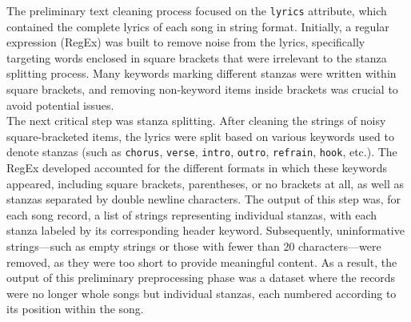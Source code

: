 The preliminary text cleaning process focused on the \texttt{lyrics} attribute,
which contained the complete lyrics of each song in string format.
Initially, a regular expression (RegEx) was built to remove noise from the
lyrics, specifically targeting words enclosed in square brackets that were
irrelevant to the stanza splitting process. Many keywords marking different
stanzas were written within square brackets, and removing non-keyword items
inside brackets was crucial to avoid potential issues.\\

The next critical step was stanza splitting. After cleaning the strings of
noisy square-bracketed items, the lyrics were split based on various keywords
used to denote stanzas (such as \texttt{chorus}, \texttt{verse}, \texttt{intro},
\texttt{outro}, \texttt{refrain}, \texttt{hook}, etc.).
The RegEx developed accounted for the different formats in which these keywords
appeared, including square brackets, parentheses, or no brackets at all, as well
as stanzas separated by double newline characters.
The output of this step was, for each song record, a list of strings
representing individual stanzas, with each stanza labeled by its corresponding
header keyword.
Subsequently, uninformative strings—such as empty strings or those with fewer
than 20 characters—were removed, as they were too short to provide meaningful
content.
As a result, the output of this preliminary preprocessing phase was a dataset
where the records were no longer whole songs but individual stanzas, each
numbered according to its position within the song.\\

